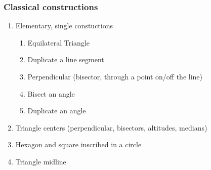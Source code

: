 \documentclass[12pt, oneside]{article}
\begin{document}
\subsubsection*{Classical constructions}
\begin{enumerate}
  \item Elementary, single constuctions
  \begin{enumerate}
    \item Equilateral Triangle
    \item Duplicate a line segment
    \item Perpendicular (bisector, through a point on/off the line)
    \item Bisect an angle
    \item Duplicate an angle
    \end{enumerate}
  \item Triangle centers (perpendicular, bisectors, altitudes, medians)
  \item Hexagon and square inscribed in a circle
  \item Triangle midline
  \end{enumerate}
\end{document}
